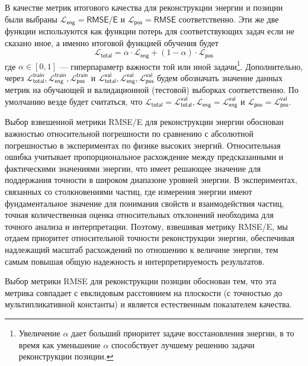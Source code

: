 \documentclass[a4paper,12pt]{extarticle}
\begin{document}
В качестве метрик итогового качества для реконструкции энергии и позиции были выбраны $\mathcal{L}_{\mathsf{eng}} = \textsf{RMSE/E}$ и $\mathcal{L}_{\mathsf{pos}} = \textsf{RMSE}$ соответственно. Эти же две функции используются как функции потерь для соответствующих задач если не сказано иное, а именно итоговой функцией обучения будет \begin{equation}\label{eq:loss_total}
    \mathcal{L}_{\mathsf{total}} = \alpha \cdot \mathcal{L}_{\mathsf{eng}} + (1 - \alpha) \cdot \mathcal{L}_{\mathsf{pos}}
\end{equation} где $\alpha \in [0, 1]$ --- гиперпараметр важности той или иной задачи\footnote{Увеличение $\alpha$ дает больший приоритет задаче восстановления энергии, в то время как уменьшение $\alpha$ способствует лучшему решению задачи реконструкции позиции.}. Дополнительно, через $\mathcal{L}_{\mathsf{total}}^{\mathsf{train}}, \mathcal{L}_{\mathsf{eng}}^{\mathsf{train}}, \mathcal{L}_{\mathsf{pos}}^{\mathsf{train}}$ и $\mathcal{L}_{\mathsf{total}}^{\mathsf{val}}, \mathcal{L}_{\mathsf{eng}}^{\mathsf{val}}, \mathcal{L}_{\mathsf{pos}}^{\mathsf{val}}$ будем обозначать значение данных метрик на обучающей и валидационной (тестовой) выборках соответственно. По умолчанию везде будет считаться, что $\mathcal{L}_{\mathsf{total}} = \mathcal{L}_{\mathsf{total}}^{\mathsf{val}}, \mathcal{L}_{\mathsf{eng}} = \mathcal{L}_{\mathsf{eng}}^{\mathsf{val}}$ и $\mathcal{L}_{\mathsf{pos}} = \mathcal{L}_{\mathsf{pos}}^{\mathsf{val}}$.

Выбор взвешенной метрики \textsf{RMSE/E} для реконструкции энергии обоснован важностью относительной погрешности по сравнению с абсолютной погрешностью в экспериментах по физике высоких энергий. Относительная ошибка учитывает пропорциональное расхождение между предсказанными и фактическими значениями энергии, что имеет решающее значение для поддержания точности в широком диапазоне уровней энергии. В экспериментах, связанных со столкновениями частиц, где измерения энергии имеют фундаментальное значение для понимания свойств и взаимодействия частиц, точная количественная оценка относительных отклонений необходима для точного анализа и интерпретации. Поэтому, взвешивая метрику \textsf{RMSE/E}, мы отдаем приоритет относительной точности реконструкции энергии, обеспечивая надлежащий масштаб расхождений по отношению к величине энергии, тем самым повышая общую надежность и интерпретируемость результатов.

Выбор метрики \textsf{RMSE} для реконструкции позиции обоснован тем, что эта метрика совпадает с евклидовым расстоянием на плоскости (с точностью до мультипликативной константы) и является естественным показателем качества.
\end{document}

